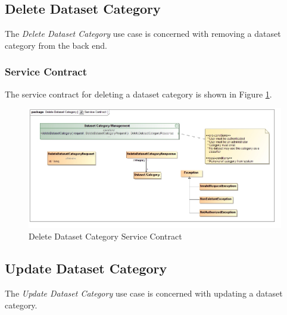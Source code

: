 \subsection {Delete Dataset Category}
The \textit{Delete Dataset Category} use case is concerned with removing a
dataset category from the back end.

\subsubsection{Service Contract}
The service contract for deleting a dataset category is shown in 
Figure \ref{fig:deleteDatasetCategoryServiceContract}.
\begin{figure}[H]
  \begin{center}
  \includegraphics[scale=0.38]{../Diagrams and Charts/Repository Management/Delete Dataset Category Service Contract.jpg}
  \caption{Delete Dataset Category Service Contract}
  \label{fig:deleteDatasetCategoryServiceContract}
  \end{center}
\end{figure}



\subsection {Update Dataset Category}
The \textit{Update Dataset Category} use case is concerned with updating a
dataset category.

